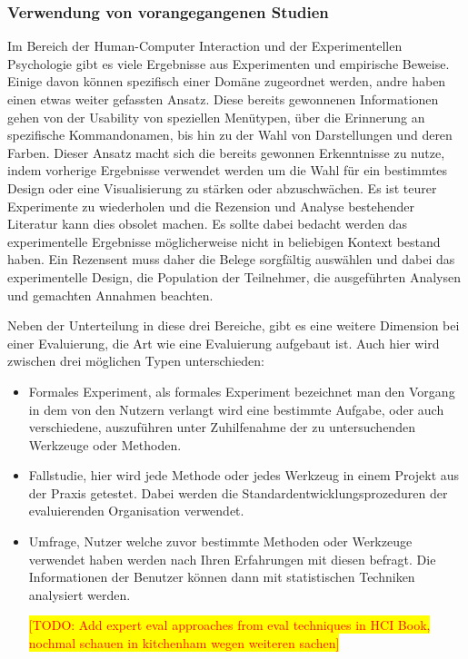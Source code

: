 \documentclass[draft=false
              ,paper=a4
              ,twoside=false
              ,fontsize=11pt
              ,headsepline
              ,BCOR10mm
              ,DIV11
              ]{scrbook}
\newcommand{\TODO}[1]{\colorbox{yellow}{\textcolor{red}{[TODO: #1]}}}
\begin{document}
\subsubsection{Verwendung von vorangegangenen Studien} %
\label{ssub:verwendung_von_vorangegangenen_studien}
Im Bereich der Human-Computer Interaction und der Experimentellen Psychologie gibt es viele Ergebnisse aus Experimenten und empirische Beweise. Einige davon können spezifisch einer Domäne zugeordnet werden, andre haben einen etwas weiter gefassten Ansatz. Diese bereits gewonnenen Informationen gehen von der Usability von speziellen Menütypen, über die Erinnerung an spezifische Kommandonamen, bis hin zu der Wahl von Darstellungen und deren Farben.
Dieser Ansatz macht sich die bereits gewonnen Erkenntnisse zu nutze, indem vorherige Ergebnisse verwendet werden um die Wahl für ein bestimmtes Design oder eine Visualisierung zu stärken oder abzuschwächen. Es ist teurer Experimente zu wiederholen und die Rezension und Analyse bestehender Literatur kann dies obsolet machen. Es sollte dabei bedacht werden das experimentelle Ergebnisse möglicherweise nicht in beliebigen Kontext bestand haben. Ein Rezensent muss daher die Belege sorgfältig auswählen und dabei das experimentelle Design, die Population der Teilnehmer, die ausgeführten Analysen und gemachten Annahmen beachten. 

\iffalse%
Neben der Unterteilung in diese drei Bereiche, gibt es eine weitere Dimension bei einer Evaluierung, die Art wie eine Evaluierung aufgebaut ist. Auch hier wird zwischen drei möglichen Typen unterschieden:

\begin{itemize}
  \item Formales Experiment, als formales Experiment bezeichnet man den Vorgang in dem von den Nutzern verlangt wird eine bestimmte Aufgabe, oder auch verschiedene, auszuführen unter Zuhilfenahme der zu untersuchenden Werkzeuge oder Methoden. 
  \item Fallstudie, hier wird jede Methode oder jedes Werkzeug in einem Projekt aus der Praxis getestet. Dabei werden die Standardentwicklungsprozeduren der evaluierenden Organisation verwendet.
  \item Umfrage, Nutzer welche zuvor bestimmte Methoden oder Werkzeuge verwendet haben werden nach Ihren Erfahrungen mit diesen befragt. Die Informationen der Benutzer können dann mit statistischen Techniken analysiert werden. 

  \TODO{Add expert eval approaches from eval techniques in HCI Book, nochmal schauen in kitchenham wegen weiteren sachen}
\end{itemize}
\end{document}
